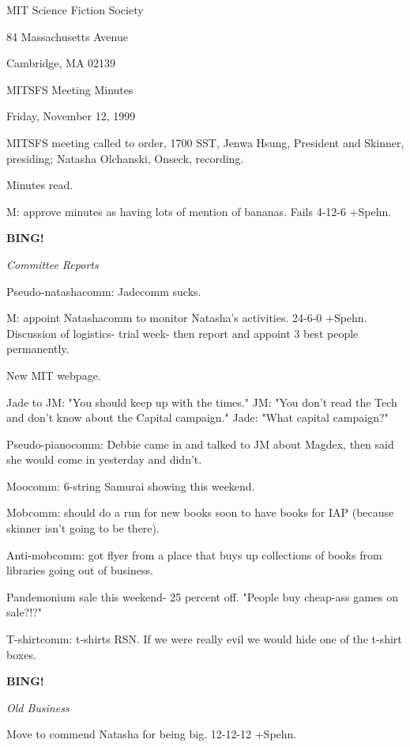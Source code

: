 \documentclass[12pt]{article}
\newcommand{\bing}{{\bf BING!} }
\newcommand{\goto}[1]{\bing \vskip 12pt \centerline{{\em{#1}}}}
\begin{document}
\begin{center}

MIT Science Fiction Society 

84 Massachusetts Avenue

Cambridge, MA 02139

\vspace{12pt}

MITSFS Meeting Minutes 

Friday, November 12, 1999

\end{center}
 
\vspace{18pt}

\setlength{\parskip}{6pt}

\noindent
MITSFS meeting called to order, 1700 SST,
Jenwa Hsung, President and Skinner, presiding; Natasha Olchanski, Onseck, recording.

Minutes read.

M: approve minutes as having lots of mention of bananas. Fails 4-12-6 +Spehn.

\goto{Committee Reports}

Pseudo-natashacomm: Jadecomm sucks.

M: appoint Natashacomm to monitor Natasha's activities. 24-6-0 +Spehn. Discussion of logistics- trial week- then report and appoint 3 best people permanently.

New MIT webpage.

Jade to JM: "You should keep up with the times." JM: "You don't read the Tech and don't know about the Capital campaign." Jade: "What capital campaign?"

Pseudo-pianocomm: Debbie came in and talked to JM about Magdex, then said she would come in yesterday and didn't.

Moocomm: 6-string Samurai showing this weekend.

Mobcomm: should do a run for new books soon to have books for IAP (because skinner isn't going to be there).

Anti-mobcomm: got flyer from a place that buys up collections of books from libraries going out of business.

Pandemonium sale this weekend- 25 percent off. "People buy cheap-ass games on sale?!?"

T-shirtcomm: t-shirts RSN. If we were really evil we would hide one of the t-shirt boxes.

\goto{Old Business}

Move to commend Natasha for being big. 12-12-12 +Spehn.
\end{document}
